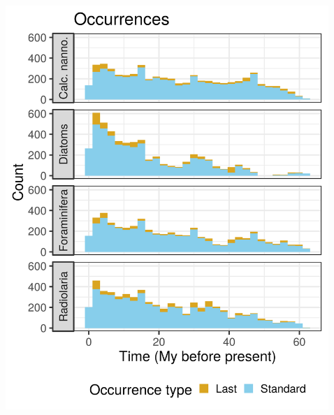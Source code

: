 \documentclass{beamer}
\begin{document}
\begin{frame}
\begin{columns}
\begin{column}{0.1\textwidth}
\begin{center}
      \end{center}
    \end{column}
    \begin{column}{0.4\textwidth}
      \includegraphics[width=\textwidth,height=0.8\textheight,keepaspectratio=true]{../results/figure/occ_time_label_full}
    \end{column}
    \begin{column}{0.4\textwidth}

\end{column}
\end{columns}
\end{frame}
\end{document}
